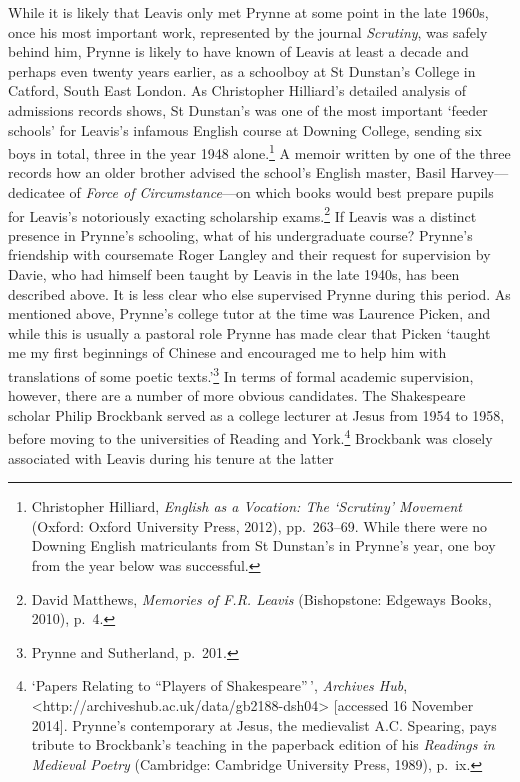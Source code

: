 \documentclass[]{article}
\begin{document}
While it is likely that Leavis only met Prynne at some point in the late
1960s, once his most important work, represented by the journal
\emph{Scrutiny}, was safely behind him, Prynne is likely to have known
of Leavis at least a decade and perhaps even twenty years earlier, as a
schoolboy at St Dunstan's College in Catford, South East London. As
Christopher Hilliard's detailed analysis of admissions records shows, St
Dunstan's was one of the most important `feeder schools' for Leavis's
infamous English course at Downing College, sending six boys in total,
three in the year 1948 alone.\footnote{Christopher Hilliard,
  \emph{English as a Vocation: The `Scrutiny' Movement} (Oxford: Oxford
  University Press, 2012), pp.~263--69. While there were no Downing
  English matriculants from St Dunstan's in Prynne's year, one boy from
  the year below was successful.} A memoir written by one of the three
records how an older brother advised the school's English master, Basil
Harvey---dedicatee of \emph{Force of Circumstance}---on which books
would best prepare pupils for Leavis's notoriously exacting scholarship
exams.\footnote{David Matthews, \emph{Memories of F.R. Leavis}
  (Bishopstone: Edgeways Books, 2010), p.~4.} If Leavis was a distinct
presence in Prynne's schooling, what of his undergraduate course?
Prynne's friendship with coursemate Roger Langley and their request for
supervision by Davie, who had himself been taught by Leavis in the late
1940s, has been described above. It is less clear who else supervised
Prynne during this period. As mentioned above, Prynne's college tutor at
the time was Laurence Picken, and while this is usually a pastoral role
Prynne has made clear that Picken `taught me my first beginnings of
Chinese and encouraged me to help him with translations of some poetic
texts.'\footnote{Prynne and Sutherland, p.~201.} In terms of formal
academic supervision, however, there are a number of more obvious
candidates. The Shakespeare scholar Philip Brockbank served as a college
lecturer at Jesus from 1954 to 1958, before moving to the universities
of Reading and York.\footnote{`Papers Relating to ``Players of
  Shakespeare''\,', \emph{Archives Hub},
  \textless{}http://archiveshub.ac.uk/data/gb2188-dsh04\textgreater{}
  {[}accessed 16 November 2014{]}. Prynne's contemporary at Jesus, the
  medievalist A.C. Spearing, pays tribute to Brockbank's teaching in the
  paperback edition of his \emph{Readings in Medieval Poetry}
  (Cambridge: Cambridge University Press, 1989), p.~ix.} Brockbank was
closely associated with Leavis during his tenure at the latter
\end{document}
